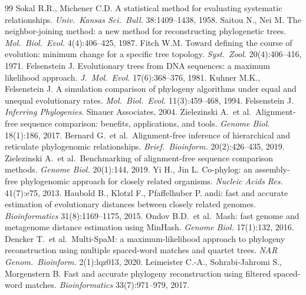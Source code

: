 \documentclass[11pt]{article}
\begin{document}
\begin{thebibliography}{99}
 Sokal R.R., Michener C.D. A statistical method for evaluating systematic relationships. \emph{Univ.\ Kansas Sci.\ Bull.} 38:1409--1438, 1958.
 Saitou N., Nei M. The neighbor-joining method: a new method for reconstructing phylogenetic trees. \emph{Mol.\ Biol.\ Evol.} 4(4):406--425, 1987.
 Fitch W.M. Toward defining the course of evolution: minimum change for a specific tree topology. \emph{Syst.\ Zool.} 20(4):406--416, 1971.
 Felsenstein J. Evolutionary trees from DNA sequences: a maximum likelihood approach. \emph{J.\ Mol.\ Evol.} 17(6):368--376, 1981.
 Kuhner M.K., Felsenstein J. A simulation comparison of phylogeny algorithms under equal and unequal evolutionary rates. \emph{Mol.\ Biol.\ Evol.} 11(3):459--468, 1994.
 Felsenstein J. \emph{Inferring Phylogenies}. Sinauer Associates, 2004.
 Zielezinski A.\ et al.\ Alignment-free sequence comparison: benefits, applications, and tools. \emph{Genome Biol.} 18(1):186, 2017.
 Bernard G.\ et al.\ Alignment-free inference of hierarchical and reticulate phylogenomic relationships. \emph{Brief.\ Bioinform.} 20(2):426--435, 2019.
 Zielezinski A.\ et al.\ Benchmarking of alignment-free sequence comparison methods. \emph{Genome Biol.} 20(1):144, 2019.
 Yi H., Jin L. Co-phylog: an assembly-free phylogenomic approach for closely related organisms. \emph{Nucleic Acids Res.} 41(7):e75, 2013.
 Haubold B., Klotzl F., Pfaffelhuber P. andi: fast and accurate estimation of evolutionary distances between closely related genomes. \emph{Bioinformatics} 31(8):1169--1175, 2015.
 Ondov B.D.\ et al.\ Mash: fast genome and metagenome distance estimation using MinHash. \emph{Genome Biol.} 17(1):132, 2016.
 Dencker T.\ et al.\ Multi-SpaM: a maximum-likelihood approach to phylogeny reconstruction using multiple spaced-word matches and quartet trees. \emph{NAR Genom.\ Bioinform.} 2(1):lqz013, 2020.
 Leimeister C.-A., Sohrabi-Jahromi S., Morgenstern B. Fast and accurate phylogeny reconstruction using filtered spaced-word matches. \emph{Bioinformatics} 33(7):971--979, 2017.

\end{thebibliography}
\end{document}
